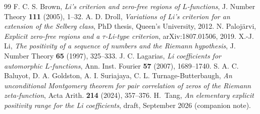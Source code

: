 \documentclass[11pt]{article}
\theoremstyle{definition}
\begin{document}
\begin{thebibliography}{99}
 F. C. S. Brown, \emph{Li's criterion and zero-free regions of $L$-functions},
J. Number Theory \textbf{111} (2005), 1--32.
 A. D. Droll, \emph{Variations of Li's criterion for an extension of the Selberg class},
PhD thesis, Queen's University, 2012.
 N. Palojärvi, \emph{Explicit zero-free regions and a $\tau$-Li-type criterion},
arXiv:1807.01506, 2019.
 X.-J. Li, \emph{The positivity of a sequence of numbers and the Riemann hypothesis},
J. Number Theory \textbf{65} (1997), 325--333.
 J. C. Lagarias, \emph{Li coefficients for automorphic $L$-functions},
Ann. Inst. Fourier \textbf{57} (2007), 1689--1740.
 S. A. C. Baluyot, D. A. Goldston, A. I. Suriajaya, C. L. Turnage-Butterbaugh,
\emph{An unconditional Montgomery theorem for pair correlation of zeros of the Riemann
zeta-function}, Acta Arith. \textbf{214} (2024), 357--376.
 H.~Tang, \emph{An elementary explicit positivity range for the Li coefficients},
draft, September 2026 (companion note).
\end{thebibliography}
\end{document}
